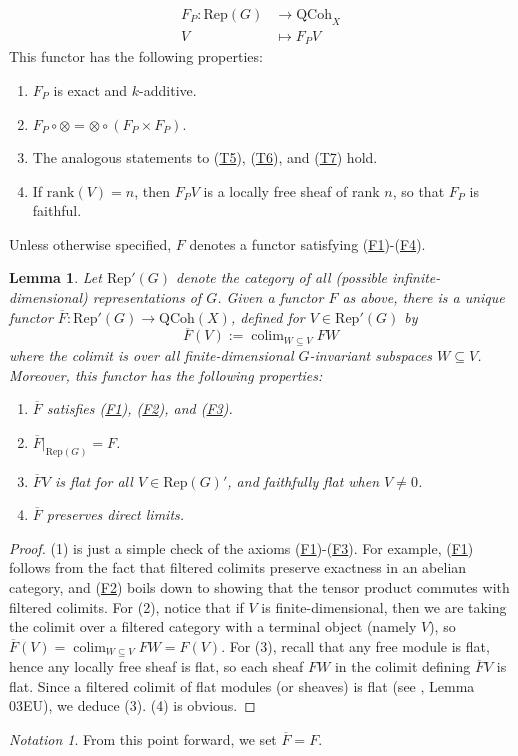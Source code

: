 \documentclass[10pt]{amsart}
\numberwithin{equation}{section}
\newcommand{\colim}{\mathop{\mathrm{colim}}}
\newcommand{\rank}{\mathrm{rank}}
\newcommand{\QCoh}{\mathrm{QCoh}}
\newcommand{\Rep}{\mathrm{Rep}}
\theoremstyle{plain}
\newtheorem{lem}[thm]{Lemma}
\theoremstyle{definition}
\theoremstyle{remark}
\newtheorem*{notation}{Notation}
\begin{document}
\begin{align*}
    F_P: \Rep(G) &\to \QCoh_X\\
    V &\mapsto F_PV
\end{align*}
This functor has the following properties:
\begin{enumerate}
    \item[(F1)]\label{F1} $F_P$ is exact and $k$-additive.
    \item[(F2)]\label{F2} $F_P \circ \otimes = \otimes \circ (F_P \times F_P)$.
    \item[(F3)] \label{F3}The analogous statements to (\hyperref[T5]{T5}), (\hyperref[T6]{T6}), and (\hyperref[T7]{T7}) hold.
    \item[(F4)] \label{F4}If $\rank(V) = n$, then $F_PV$ is a locally free sheaf of rank $n$, so that $F_P$ is faithful.
\end{enumerate}
Unless otherwise specified, $F$ denotes a functor satisfying (\hyperref[F1]{F1})-(\hyperref[F4]{F4}).

\begin{lem}
    Let $\Rep'(G)$ denote the category of all (possible infinite-dimensional) representations of $G$. Given a functor $F$ as above, there is a unique functor $\overline{F}: \Rep'(G) \to \QCoh(X)$, defined for $V \in \Rep'(G)$ by
    \[\overline{F}(V) := \colim_{W \subseteq V}FW\]
    where the colimit is over all finite-dimensional $G$-invariant subspaces $W \subseteq V$. Moreover, this functor has the following properties:
    \begin{enumerate}
        \item $\overline{F}$ satisfies (\hyperref[F1]{F1}), (\hyperref[F2]{F2}), and (\hyperref[F3]{F3}).
        \item $\overline{F}|_{\Rep(G)} = F$.
        \item $\overline{F}V$ is flat for all $V \in \Rep(G)'$, and faithfully flat when $V \ne 0$.
        \item $\overline{F}$ preserves direct limits.
    \end{enumerate}
\end{lem}

\begin{proof}
    (1) is just a simple check of the axioms (\hyperref[F1]{F1})-(\hyperref[F3]{F3}). For example, (\hyperref[F1]{F1}) follows from the fact that filtered colimits preserve exactness in an abelian category, and (\hyperref[F2]{F2}) boils down to showing that the tensor product commutes with filtered colimits. For (2), notice that if $V$ is finite-dimensional, then we are taking the colimit over a filtered category with a terminal object (namely $V$), so $\overline{F}(V) = \colim_{W \subseteq V}FW = F(V)$. For (3), recall that any free module is flat, hence any locally free sheaf is flat, so each sheaf $FW$ in the colimit defining $\overline{F}V$ is flat. Since a filtered colimit of flat modules (or sheaves) is flat (see \cite{stacks}, Lemma 03EU), we deduce (3). (4) is obvious. 
\end{proof}

\begin{notation}
    From this point forward, we set $\overline{F} = F$.
\end{notation}
\newpage
\printbibliography
\end{document}
